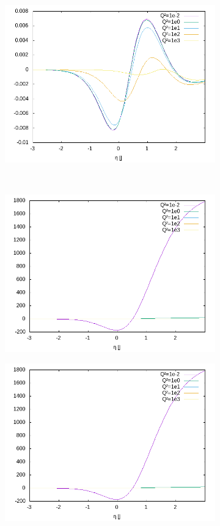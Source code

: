 \begin{figure}[ht!]
\begin{subfigure}[t]{.3\textwidth}
	\includegraphics[width=\textwidth]{../../img2/partonic/cq1_VV_x2g1}
\end{subfigure}\\%
\begin{subfigure}[t]{.3\textwidth}
	\includegraphics[width=\textwidth]{../../img2/partonic/cq1_AA_F2}
\end{subfigure}%
\begin{subfigure}[t]{.3\textwidth}
	\includegraphics[width=\textwidth]{../../img2/partonic/cq1_AA_FL}

\end{subfigure}
\end{figure}
